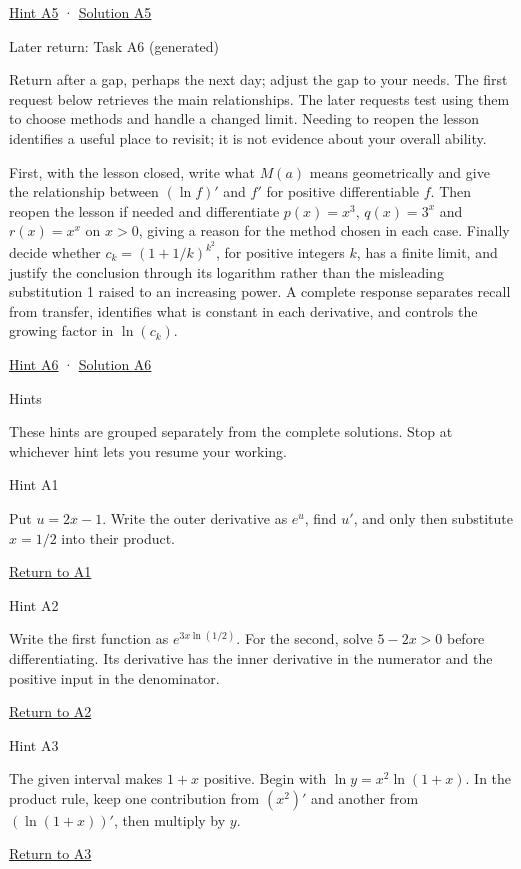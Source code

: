 \documentclass[
  11pt,
]{article}
\begin{document}
\protect\hyperlink{hint-a5}{Hint A5} ·
\protect\hyperlink{solution-a5}{Solution A5}

Later return: Task A6 (generated)

Return after a gap, perhaps the next day; adjust the gap to your needs.
The first request below retrieves the main relationships. The later
requests test using them to choose methods and handle a changed limit.
Needing to reopen the lesson identifies a useful place to revisit; it is
not evidence about your overall ability.

First, with the lesson closed, write what \(M(a)\) means geometrically
and give the relationship between \((\ln f)'\) and \(f'\) for positive
differentiable \(f\). Then reopen the lesson if needed and differentiate
\(p(x)=x^3\), \(q(x)=3^x\) and \(r(x)=x^x\) on \(x>0\), giving a reason
for the method chosen in each case. Finally decide whether
\(c_k=(1+1/k)^{k^2}\), for positive integers \(k\), has a finite limit,
and justify the conclusion through its logarithm rather than the
misleading substitution 1 raised to an increasing power. A complete
response separates recall from transfer, identifies what is constant in
each derivative, and controls the growing factor in \(\ln(c_k)\).

\protect\hyperlink{hint-a6}{Hint A6} ·
\protect\hyperlink{solution-a6}{Solution A6}

Hints

These hints are grouped separately from the complete solutions. Stop at
whichever hint lets you resume your working.

Hint A1

Put \(u=2x-1\). Write the outer derivative as \(e^u\), find \(u'\), and
only then substitute \(x=1/2\) into their product.

\protect\hyperlink{task-a1}{Return to A1}

Hint A2

Write the first function as \(e^{3x\ln(1/2)}\). For the second, solve
\(5-2x>0\) before differentiating. Its derivative has the inner
derivative in the numerator and the positive input in the denominator.

\protect\hyperlink{task-a2}{Return to A2}

Hint A3

The given interval makes \(1+x\) positive. Begin with
\(\ln y=x^2\ln(1+x)\). In the product rule, keep one contribution from
\((x^2)'\) and another from \((\ln(1+x))'\), then multiply by \(y\).

\protect\hyperlink{task-a3}{Return to A3}
\end{document}
